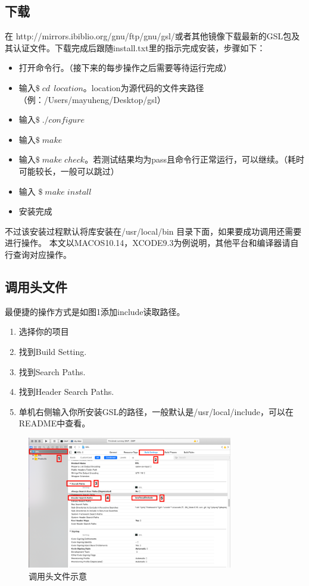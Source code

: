 \documentclass[a4paper,11pt,onecolumn,twoside]{article}
\begin{document}
\subsection{下载}
在 http://mirrors.ibiblio.org/gnu/ftp/gnu/gsl/或者其他镜像下载最新的GSL包及其认证文件。下载完成后跟随install.txt里的指示完成安装，步骤如下：
\begin{itemize}
\item 打开命令行。（接下来的每步操作之后需要等待运行完成）
\item 输入$\$ \; cd \; \,location$。location为源代码的文件夹路径（例：/Users/mayuheng/Desktop/gsl）
\item 输入$\$ \; ./configure$
\item 输入$\$\;make$
\item 输入$\$\;make\;check$。若测试结果均为pass且命令行正常运行，可以继续。（耗时可能较长，一般可以跳过）
\item 输入 $\$\; make\;install$
\item 安装完成
\end{itemize}
\par
不过该安装过程默认将库安装在/usr/local/bin 目录下面，如果要成功调用还需要进行操作。
本文以MACOS10.14，XCODE9.3为例说明，其他平台和编译器请自行查询对应操作。
\subsection{调用头文件}
最便捷的操作方式是如图1添加include读取路径。
\begin{enumerate}
\item 选择你的项目
\item 找到Build Setting.
\item 找到Search Paths.
\item 找到Header Search Paths.
\item 单机右侧输入你所安装GSL的路径，一般默认是/usr/local/include，可以在README中查看。
\end{enumerate}
\begin{figure}[htbp]
  \centering
  \includegraphics[width=0.8\textwidth]{figures/1.png}
  \caption{调用头文件示意} \label{pngsample}
\end{figure}
\end{document}
